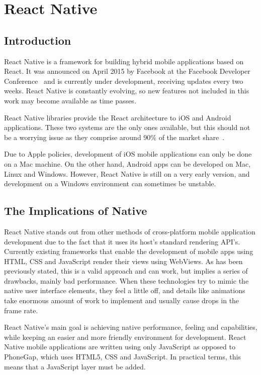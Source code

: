 \chapter{React Native}
\label{ch:reactnative}
\justifying
\section{Introduction}

React Native is a framework for building hybrid mobile applications based on React. It was announced on April 2015 by Facebook at the Facebook Developer Conference~\cite{f8} and is currently under development, receiving updates every two weeks. React Native is constantly evolving, so new features not included in this work may become available as time passes.

React Native libraries provide the React architecture to iOS and Android applications. These two systems are the only ones available, but this should not be a worrying issue as they comprise around 90\% of the market share~\cite{3topmarketshare}.

Due to Apple policies, development of iOS mobile applications can only be done on a Mac machine. On the other hand, Android apps can be developed on Mac, Linux and Windows. However, React Native is still on a very early version, and development on a Windows environment can sometimes be unstable.

\section{The Implications of Native}

React Native stands out from other methods of cross-platform mobile application development due to the fact that it uses its host's standard rendering API's. Currently existing frameworks that enable the development of mobile apps using HTML, CSS and JavaScript render their views using WebViews. As has been previously stated, this is a valid approach and can work, but implies a series of drawbacks, mainly bad performance. When these technologies try to mimic the native user interface elements, they feel a little off, and details like animations take enormous amount of work to implement and usually cause drops in the frame rate.

React Native's main goal is achieving native performance, feeling and capabilities, while keeping an easier and more friendly environment for development. React Native mobile applications are written using only JavaScript as opposed to PhoneGap, which uses HTML5, CSS and JavaScript. In practical terms, this means that a JavaScript layer must be added.


